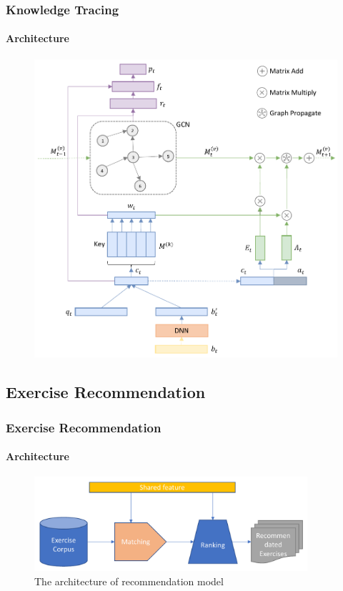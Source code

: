 \documentclass{beamer}
\begin{document}
\begin{frame}
  \frametitle{Knowledge Tracing}
  \framesubtitle{Architecture}
  \begin{figure}
    \centering
    \includegraphics[height=0.80\textheight]{figures/ch3-ov.pdf}
  \end{figure}
\end{frame}






\subsection{Exercise Recommendation}
\begin{frame}
  \frametitle{Exercise Recommendation}
  \framesubtitle{Architecture}
  \begin{figure}
    \includegraphics[width=0.9\textwidth]{figures/ch4-ov.pdf}
    \caption{The architecture of recommendation model}
  \end{figure}
\end{frame}
\end{document}
